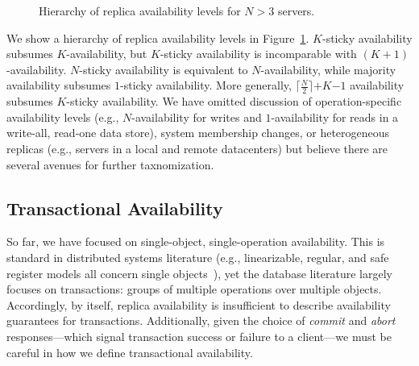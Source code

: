 \begin{figure}
\centering
{}
\caption{Hierarchy of replica availability levels for $N>3$ servers.}
\label{fig:availability-order}
\end{figure}

We show a hierarchy of replica availability levels in
Figure~\ref{fig:availability-order}. $K$-sticky availability subsumes
$K$-availability, but $K$-sticky availability is incomparable with
$(K+1)$-availability. $N$-sticky availability is equivalent to
$N$-availability, while majority availability subsumes $1$-sticky
availability. More generally, $\lceil \frac{N}{2} \rceil$$+$$K$$-$$1$
availability subsumes $K$-sticky availability. We have omitted
discussion of operation-specific availability levels (e.g.,
$N$-availability for writes and $1$-availability for reads in a
write-all, read-one data store), system membership changes, or
heterogeneous replicas (e.g., servers in a local and remote
datacenters) but believe there are several avenues for further
taxnomization.

\subsection{Transactional Availability}

So far, we have focused on single-object, single-operation
availability. This is standard in distributed systems literature
(e.g., linearizable, regular, and safe register models all concern
single objects~\cite{herlihy-art}), yet the database literature
largely focuses on transactions: groups of multiple operations over
multiple objects. Accordingly, by itself, replica availability is
insufficient to describe availability guarantees for
transactions. Additionally, given the choice of \textit{commit} and
\textit{abort} responses---which signal transaction success or failure
to a client---we must be careful in how we define transactional availability.

